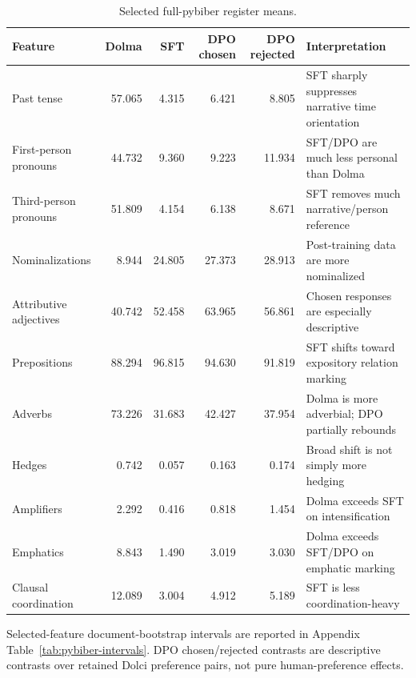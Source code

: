 \begin{table}[t]
\centering
\caption{Selected full-pybiber register means.}
\label{tab:pybiber-means}
\begin{threeparttable}
\small
\begin{tabularx}{\textwidth}{@{}p{}rrrrX@{}}
\toprule
Feature & Dolma & SFT & DPO chosen & DPO rejected & Interpretation \\
\midrule
Past tense & 57.065 & 4.315 & 6.421 & 8.805 & SFT sharply suppresses narrative time orientation \\
First-person pronouns & 44.732 & 9.360 & 9.223 & 11.934 & SFT/DPO are much less personal than Dolma \\
Third-person pronouns & 51.809 & 4.154 & 6.138 & 8.671 & SFT removes much narrative/person reference \\
Nominalizations & 8.944 & 24.805 & 27.373 & 28.913 & Post-training data are more nominalized \\
Attributive adjectives & 40.742 & 52.458 & 63.965 & 56.861 & Chosen responses are especially descriptive \\
Prepositions & 88.294 & 96.815 & 94.630 & 91.819 & SFT shifts toward expository relation marking \\
Adverbs & 73.226 & 31.683 & 42.427 & 37.954 & Dolma is more adverbial; DPO partially rebounds \\
Hedges & 0.742 & 0.057 & 0.163 & 0.174 & Broad shift is not simply more hedging \\
Amplifiers & 2.292 & 0.416 & 0.818 & 1.454 & Dolma exceeds SFT on intensification \\
Emphatics & 8.843 & 1.490 & 3.019 & 3.030 & Dolma exceeds SFT/DPO on emphatic marking \\
Clausal coordination & 12.089 & 3.004 & 4.912 & 5.189 & SFT is less coordination-heavy \\
\bottomrule
\end{tabularx}
\begin{tablenotes}
\footnotesize
\item Selected-feature document-bootstrap intervals are reported in Appendix Table~\ref{tab:pybiber-intervals}. DPO chosen/rejected contrasts are descriptive contrasts over retained Dolci preference pairs, not pure human-preference effects.
\end{tablenotes}
\end{threeparttable}
\end{table}

